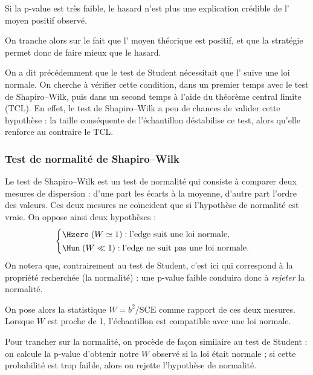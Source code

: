 Si la p-value est très faible, le hasard n'est plus une
explication crédible de l'\edgevar{} moyen positif observé.

On tranche alors sur le fait que l'\edgevar{} moyen théorique est positif, et que la
stratégie permet donc de faire mieux que le hasard.


On a dit précédemment que le test de Student nécessitait que l'\edgevar{} suive
une loi normale. On cherche à vérifier cette condition, dans un premier
temps avec le test de Shapiro--Wilk, puis dans un second temps à l'aide du
théorème central limite (TCL). En effet, le test de Shapiro--Wilk a peu de
chances de valider cette hypothèse : la taille conséquente de l'échantillon
déstabilise ce test, alors qu'elle renforce au contraire le TCL.

\subsubsection*{Test de normalité de Shapiro--Wilk} %
Le test de Shapiro--Wilk est un test de normalité qui consiste à comparer
deux mesures de dispersion : d'une part les écarts à la moyenne, d'autre
part l'ordre des valeurs. Ces deux mesures ne coïncident que si
l'hypothèse de normalité est vraie. On oppose ainsi deux hypothèses :
\[
  \begin{cases}
    \Hzero \;(W \simeq 1) : \text{l'edge suit une loi normale,}\\[2pt]
    \Hun \;(W \ll 1) : \text{l'edge ne suit pas une loi normale.}
  \end{cases}
\]
On notera que, contrairement au test de Student, c'est ici \Hzero{} qui
correspond à la propriété recherchée (la normalité) : une p-value faible
conduira donc à \emph{rejeter} la normalité.

On pose alors la statistique \(W = b^2 / \mathrm{SCE}\) comme rapport de
ces deux mesures. Lorsque \(W\) est proche de 1, l'échantillon est
compatible avec une loi normale.

Pour trancher sur la normalité, on procède de façon similaire au test de
Student : on calcule la p-value d'obtenir notre \(W\) observé si la loi
était normale ; si cette probabilité est trop faible, alors on rejette
l'hypothèse de normalité.


